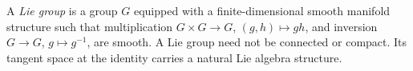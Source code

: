 
A \emph{Lie group} is a group $G$ equipped with a finite-dimensional smooth manifold structure such that multiplication $G\times G\to G$, $(g,h)\mapsto gh$, and inversion $G\to G$, $g\mapsto g^{-1}$, are smooth. A Lie group need not be connected or compact. Its tangent space at the identity carries a natural Lie algebra structure.
